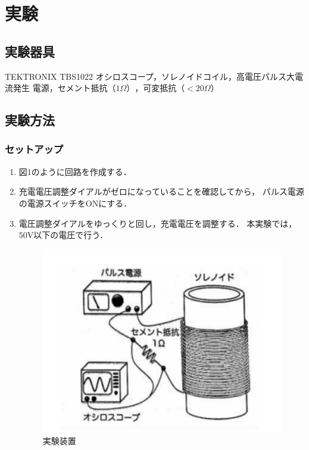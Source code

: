 
\section{実験}

\subsection{実験器具}
TEKTRONIX TBS1022 オシロスコープ，ソレノイドコイル，高電圧パルス大電流発生
電源，セメント抵抗$（1\Omega）$，可変抵抗$（<20\Omega）$

\newpage

\subsection{実験方法}
\subsubsection{セットアップ}
\begin{enumerate}
    \item 図1のように回路を作成する．
    \item 充電電圧調整ダイアルがゼロになっていることを確認してから，
    パルス電源の電源スイッチをONにする．
    \item 電圧調整ダイアルをゆっくりと回し，充電電圧を調整する．
    本実験では，$50\si{\volt}$以下の電圧で行う．
    \begin{figure}[H]
        \begin{center}
            \includegraphics[scale=0.75]{figure1.pdf}
            \caption{実験装置}
        \end{center}
    \end{figure}
\end{enumerate}

